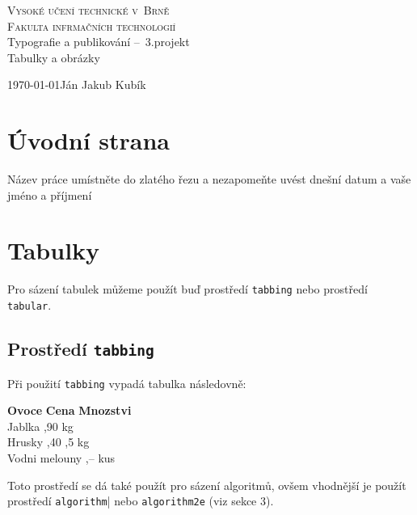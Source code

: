 \documentclass[a4paper, 11pt, times]{article}
\begin{document}
\begin{center}
  \Huge\textsc{Vysoké učení technické v~Brně} \\
      \huge\textsc{Fakulta infrmačních technologií}\\
  \huge Typografie a publikování \---\ 3.projekt\\
  \Huge{Tabulky a obrázky}
\end{center}

{\LARGE \today \hfill Ján Jakub Kubík}
\thispagestyle{empty}
\newpage


\clearpage
\setcounter{page}{1}


\section{Úvodní strana}
Název práce umístněte do zlatého řezu a nezapomeňte
uvést dnešní datum a vaše jméno a příjmení


\section{Tabulky}
Pro sázení tabulek můžeme použít buď prostředí \texttt{tabbing} nebo prostředí \texttt{tabular}.


\subsection{Prostředí \texttt{tabbing}  }
Při použití \texttt{tabbing} vypadá tabulka následovně:


\begin{tabbing}
  \textbf{Ovoce} \hspace{16mm}\= \textbf{Cena} \quad  \= \textbf{Mnozstvi}  \\
       Jablka ,90  kg \\
       Hrusky ,40 ,5 kg \\
       Vodni melouny ,--  kus
\end{tabbing}
Toto prostředí se dá také použít pro sázení algoritmů, ovšem vhodnější je použít
prostředí \texttt{algorithm}| nebo \texttt{algorithm2e}  (viz sekce 3).


\end{document}
